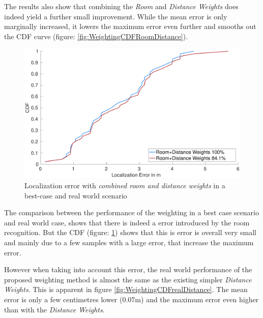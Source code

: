 The results also show that combining the \emph{Room} and \emph{Distance Weights} does indeed yield a further small improvement. While the mean error is only marginally increased, it lowers the maximum error even further and smooths out the CDF curve (figure: \ref{fig:WeightingCDFRoomDistance}).



\begin{figure}[h]
\centering
\includegraphics[width=\textwidth]{Figures/WeightingCDF_realRW}
\decoRule
\caption[Weighting method comparison]{Localization error with \emph{combined room and distance weights} in a best-case and real world scenario}
\label{fig:WeightingCDFrealRoom}
\end{figure}


The comparison between the performance of the weighting in a best case scenario and real world case, shows that there is indeed a error introduced by the room recognition. But the CDF (figure: \ref{fig:WeightingCDFrealRoom}) shows that this is error is overall very small and mainly due to a few samples with a large error, that increase the maximum error.

However when taking into account this error, the real world performance of the proposed weighting method is almost the same as the existing simpler \emph{Distance Weights}. This is apparent in figure \ref{fig:WeightingCDFrealDistance}. The mean error is only a few centimetres lower (0.07m) and the maximum error even higher than with the \emph{Distance Weights}.

